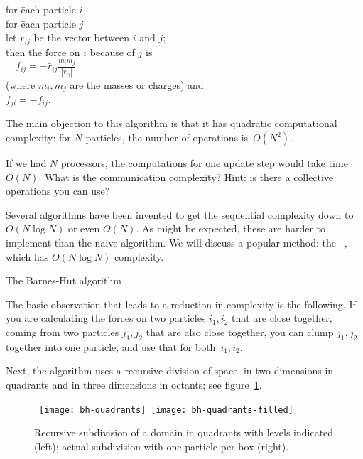   \begin{tabbing}
    for \=each particle $i$\\
    \>for \= each particle $j$\\
    \>\> let $\bar r_{ij}$ be the vector between $i$ and $j$;\\
    \>\> then the force on $i$ because of $j$ is\\
    \>\> $\quad f_{ij} = -\bar r_{ij}\frac{m_im_j}{|r_{ij}|}$\\
    \>\> (where $m_i,m_j$ are the masses or charges) and\\
    \>\> $f_{ji}=-f_{ij}$.
  \end{tabbing}

The main objection to this algorithm is that it has quadratic computational
complexity: for $N$ particles, the number of operations is~$O(N^2)$.

\begin{exercise}
  If we had $N$ processors, the computations for one update step would
  take time~$O(N)$.  What is the communication complexity? Hint: is
  there a collective operations you can use?
\end{exercise}

Several algorithms have been invented to get the sequential complexity
down to $O(N\log N)$ or even $O(N)$. As might be expected, these are
harder to implement than the naive algorithm. We will discuss a
popular method: the ~\cite{BarnesHut},
which has $O(N\log N)$ complexity.

 {The Barnes-Hut algorithm}

The basic observation that leads to a reduction in complexity is the
following. If you are calculating the forces on two particles
$i_1,i_2$ that are close together, coming from two particles $j_1,j_2$
that are also close together, you can clump $j_1,j_2$ together into
one particle, and use that for both~$i_1,i_2$.

Next, the algorithm uses a recursive division of space, in two
dimensions in quadrants and in three dimensions in octants; see
figure~\ref{fig:bh-quadrants}.
\begin{figure}[ht]
  \hbox{%
  \texttt{[image: bh-quadrants]}
  \texttt{[image: bh-quadrants-filled]}%
  }
  \caption{Recursive subdivision of a domain in quadrants with levels
    indicated (left); actual subdivision with one particle per box (right).}
  \label{fig:bh-quadrants}
\end{figure}

